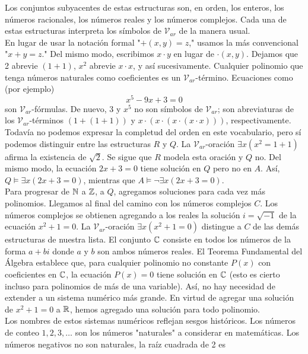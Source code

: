 \documentclass[12pt,a4paper]{book}
\newcommand{\comillas}[1]{"#1"}
\newcommand{\VV}{\mathcal{V}}
\begin{document}
    Los conjuntos subyacentes de estas estructuras son, en orden, los enteros, los números racionales, los números reales y
    los números complejos. Cada una de estas estructuras interpreta los símbolos de $\VV_{ar}$ de la manera usual.\\
    En lugar de usar la notación formal \comillas{$+(x,y)=z$,} usamos la más convencional \comillas{$x+y=z$.} Del mismo
    modo, escribimos $x\cdot y$ en lugar de $\cdot(x,y)$. Dejamos que 2 abrevie $(1+1)$, $x^{2}$ abrevie $x\cdot x$, y así
    sucesivamente. Cualquier polinomio que tenga números naturales como coeficientes es un $\VV_{ar}$-término. Ecuaciones
    como (por ejemplo)
    \begin{equation*}
        x^{5}-9x+3=0
    \end{equation*}
    son $\VV_{ar}$-fórmulas. De nuevo, 3 y $x^{5}$ no son símbolos de $\VV_{ar}$; son abreviaturas de los $\VV_{ar}$-términos
    $(1+(1+1))$ y $x\cdot(x\cdot(x\cdot(x\cdot x)))$, respectivamente.\\
    Todavía no podemos expresar la completud del orden en este vocabulario, pero sí podemos distinguir entre las
    estructuras $R$ y $Q$. La $\VV_{ar}$-oración $\exists x(x^{2}=1+1)$ afirma la existencia de $\sqrt{2}$. Se sigue que
    $R$ modela esta oración y $Q$ no. Del mismo modo, la ecuación $2x+3=0$ tiene solución en $Q$ pero no en $A$. Así,
    $Q\models\exists x(2x+3=0)$, mientras que $A\models\neg\exists x(2x+3=0)$.\\
    Para progresar de $\mathbb{N}$ a $\mathbb{Z}$, a $Q$, agregamos soluciones para cada vez más polinomios. Llegamos al final del camino
    con los números complejos $C$. Los números complejos se obtienen agregando a los reales la solución $i=\sqrt{-1}$ de la
    ecuación $x^{2}+1=0$. La $\VV_{ar}$-oración $\exists x(x^{2}+1=0)$ distingue a $C$ de las demás estructuras de nuestra
    lista. El conjunto $\mathbb{C}$ consiste en todos los números de la forma $a+bi$ donde $a$ y $b$ son ambos números reales. El
    Teorema Fundamental del Álgebra establece que, para cualquier polinomio no constante $P(x)$ con coeficientes en $\mathbb{C}$, la
    ecuación $P(x)=0$ tiene solución en $\mathbb{C}$ (esto es cierto incluso para polinomios de más de una variable). Así, no hay
    necesidad de extender a un sistema numérico más grande. En virtud de agregar una solución de $x^{2}+1=0$ a $\mathbb{R}$, hemos
    agregado una solución para todo polinomio.\\
    Los nombres de estos sistemas numéricos reflejan sesgos históricos. Los números de conteo $1,2,3,\dots$ son los números
    \comillas{naturales} a considerar en matemáticas. Los números negativos no son naturales, la raíz cuadrada de 2 es
\end{document}
